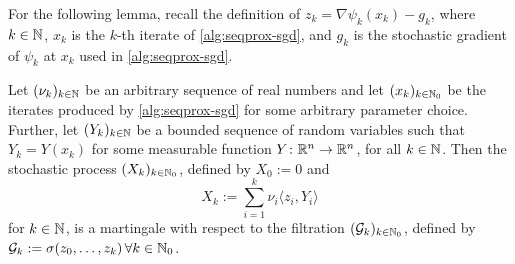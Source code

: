 For the following lemma, recall the definition of $z_k = \nabla \psi_k(x_k) - g_k$,
where $k\in\mathbb{N}$, $x_k$ is the $k$-th iterate of \cref{alg:seqprox-sgd}, and $g_k$
is the stochastic gradient of $\psi_k$ at $x_k$ used in \cref{alg:seqprox-sgd}.
\begin{lemma}
    \label{lem:xk-is-martingale}
    Let $(\nu_k)_{k\in\mathbb{N}}$ be an arbitrary sequence of real numbers
    and let $(x_k)_{k\in\mathbb{N}_0}$ be the iterates produced by \cref{alg:seqprox-sgd}
    for some arbitrary parameter choice. Further, let
    $(Y_k)_{k\in\mathbb{N}}$ be a bounded sequence of random variables such that
    $Y_k = Y(x_k)$ for
    some measurable function $Y\colon\mathbb{R}^n\to\mathbb{R}^n$,
    for all $k\in\mathbb{N}$.
    Then the stochastic process $(X_k)_{k\in\mathbb{N}_0}$, defined by $X_0 := 0$
    and
    \[
        X_k := \sum_{i=1}^k \nu_i \langle z_i, Y_i \rangle
    \]
    for $k\in\mathbb{N}$, is a martingale with respect to the filtration $(\mathcal{G}_k)_{k\in\mathbb{N}_0}$,
    defined by $\mathcal{G}_k := \sigma(z_0, \dots, z_k) \, \forall k\in\mathbb{N}_0$. 
\end{lemma}
